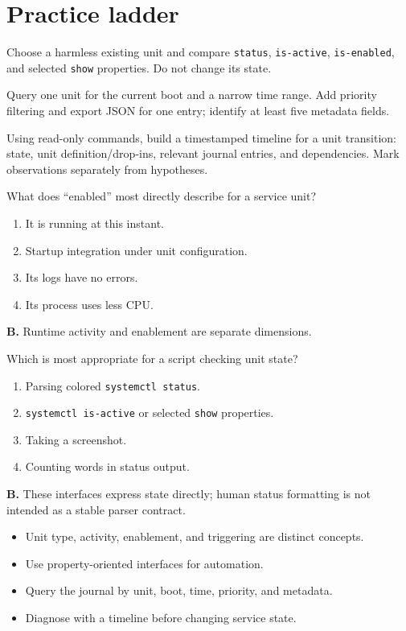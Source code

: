 \documentclass[11pt,oneside,openany]{book}
\newcommand{\fourchoices}[4]{%
  \begin{enumerate}[label=\Alph*),leftmargin=2em,itemsep=0.25em]
    \item #1
    \item #2
    \item #3
    \item #4
  \end{enumerate}}
\begin{document}
\section{Practice ladder}
\begin{practicebox}[title={Easy -- read-only unit portrait}]
Choose a harmless existing unit and compare \texttt{status}, \texttt{is-active}, \texttt{is-enabled}, and selected \texttt{show} properties. Do not change its state.
\end{practicebox}
\begin{practicebox}[title={Medium -- journal window}]
Query one unit for the current boot and a narrow time range. Add priority filtering and export JSON for one entry; identify at least five metadata fields.
\end{practicebox}
\begin{practicebox}[title={Hard -- build an evidence timeline}]
Using read-only commands, build a timestamped timeline for a unit transition: state, unit definition/drop-ins, relevant journal entries, and dependencies. Mark observations separately from hypotheses.
\end{practicebox}

\begin{questionbox}[title={Medium 14.1 -- Enablement}]
What does “enabled” most directly describe for a service unit?
\fourchoices{It is running at this instant.}{Startup integration under unit configuration.}{Its logs have no errors.}{Its process uses less CPU.}
\end{questionbox}
\begin{answerbox}
\textbf{B.} Runtime activity and enablement are separate dimensions.
\end{answerbox}

\begin{questionbox}[title={Hard 14.2 -- Automation interface}]
Which is most appropriate for a script checking unit state?
\fourchoices{Parsing colored \texttt{systemctl status}.}{\texttt{systemctl is-active} or selected \texttt{show} properties.}{Taking a screenshot.}{Counting words in status output.}
\end{questionbox}
\begin{answerbox}
\textbf{B.} These interfaces express state directly; human status formatting is not intended as a stable parser contract.
\end{answerbox}

\begin{recapbox}
\begin{itemize}
  \item Unit type, activity, enablement, and triggering are distinct concepts.
  \item Use property-oriented interfaces for automation.
  \item Query the journal by unit, boot, time, priority, and metadata.
  \item Diagnose with a timeline before changing service state.
\end{itemize}
\end{recapbox}
\end{document}
